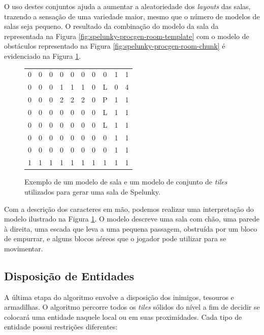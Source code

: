 O uso destes conjuntos ajuda a aumentar a aleatoriedade dos \textit{layouts} das
salas, trazendo a sensação de uma variedade maior, mesmo que o número de modelos
de salas seja pequeno. O resultado da combinação do modelo da sala da
representada na Figura \ref{fig:spelunky-procgen-room-template} com o modelo de
obstáculos representado na Figura \ref{fig:spelunky-procgen-room-chunk} é
evidenciado na Figura \ref{fig:spelunky-procgen-room-combination}.

\begin{figure}[htb!]
\centering
\begin{tabular}{c c c c c c c c c c}
    0 & 0 & 0 & 0 & 0 & 0 & 0 & 0 & 1 & 1 \\
    0 & 0 & 0 & 1 & 1 & 1 & 0 & L & 0 & 4 \\
    0 & 0 & 0 & 2 & 2 & 2 & 0 & P & 1 & 1 \\
    0 & 0 & 0 & 0 & 0 & 0 & 0 & L & 1 & 1 \\
    0 & 0 & 0 & 0 & 0 & 0 & 0 & L & 1 & 1 \\
    0 & 0 & 0 & 0 & 0 & 0 & 0 & 0 & 1 & 1 \\
    0 & 0 & 0 & 0 & 0 & 0 & 0 & 0 & 1 & 1 \\
    1 & 1 & 1 & 1 & 1 & 1 & 1 & 1 & 1 & 1 \\
\end{tabular}
\caption{\label{fig:spelunky-procgen-room-combination}Exemplo de um modelo de
sala e um modelo de conjunto de \textit{tiles} utilizados para gerar uma sala de
Spelunky.}
\end{figure}

Com a descrição dos caracteres em mão, podemos realizar uma interpretação do
modelo ilustrado na Figura \ref{fig:spelunky-procgen-room-combination}. O modelo
descreve uma sala com chão, uma parede à direita, uma escada que leva a uma
pequena passagem, obstruída por um bloco de empurrar, e alguns blocos aéreos que
o jogador pode utilizar para se movimentar.

\subsection{\label{section:spelunky-procgen-entities}Disposição de Entidades}
A última etapa do algoritmo envolve a disposição dos inimigos, tesouros e
armadilhas. O algoritmo percorre todos os \textit{tiles} sólidos do nível a fim
de decidir se colocará uma entidade naquele local ou em suas proximidades.  Cada
tipo de entidade possui restrições diferentes:

